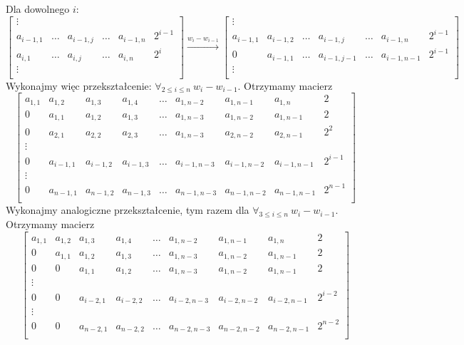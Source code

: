 \documentclass[]{sinol}
\begin{document}
\begin{zadanie}
        Dla dowolnego $i$:
        \[
         \begin{bmatrix}
            \vdots \\
            a_{i-1, 1} & \dots & a_{i-1,j} & \dots & a_{i-1, n} & 2^{i-1} \\
            a_{i, 1} & \dots & a_{i,j} & \dots & a_{i, n} & 2^i \\
            \vdots \\
        \end{bmatrix} 
        \xrightarrow{w_i-w_{i-1}}
        \begin{bmatrix}
            \vdots \\
            a_{i-1,1} & a_{i-1,2} & \dots & a_{i-1,j} & \dots & a_{i-1, n} & 2^{i-1} \\
            0 & a_{i-1,1} & \dots & a_{i-1,j-1} & \dots & a_{i-1, n-1} & 2^{i-1} \\
            \vdots \\
        \end{bmatrix} 
        \]
        Wykonajmy więc przekształcenie:
        \(\forall_{2\leq i \leq n} \ w_i - w_{i-1}\). Otrzymamy macierz
        \[
        \begin{bmatrix}
            a_{1,1} & a_{1,2} & a_{1,3} & a_{1,4} & \dots & a_{1,n-2} & a_{1, n-1} & a_{1,n} & 2 \\
            0 & a_{1,1} & a_{1,2} & a_{1,3} & \dots & a_{1,n-3} & a_{1,n-2} & a_{1, n-1} & 2 \\
            0 & a_{2,1} & a_{2,2} & a_{2,3} & \dots & a_{1,n-3} & a_{2,n-2} & a_{2, n-1} & 2^2 \\
            \vdots \\
            0 & a_{i-1,1} & a_{i-1,2} & a_{i-1,3} & \dots & a_{i-1,n-3} & a_{i-1, n-2}  & a_{i-1, n-1} & 2^{i-1} \\
            \vdots \\
            0 & a_{n-1,1} & a_{n-1,2} & a_{n-1,3} & \dots & a_{n-1,n-3} & a_{n-1, n-2}  & a_{n-1, n-1} & 2^{n-1} \\
        \end{bmatrix}
        \]
        Wykonajmy analogiczne przekształcenie, tym razem dla \(\forall_{3\leq i \leq n} \ w_i - w_{i-1}\). Otrzymamy macierz
        \[
        \begin{bmatrix}
            a_{1,1} & a_{1,2} & a_{1,3} & a_{1,4} & \dots & a_{1,n-2} & a_{1, n-1} & a_{1,n} & 2 \\
            0 & a_{1,1} & a_{1,2} & a_{1,3} & \dots & a_{1,n-3} & a_{1,n-2} & a_{1, n-1} & 2 \\
            0 & 0 & a_{1,1} & a_{1,2} & \dots &  a_{1,n-3} & a_{1,n-2} & a_{1, n-1} & 2 \\
            \vdots \\
            0 & 0 & a_{i-2,1} & a_{i-2,2} & \dots & a_{i-2,n-3} & a_{i-2, n-2}  & a_{i-2, n-1} & 2^{i-2} \\
            \vdots \\
            0 & 0 & a_{n-2,1} & a_{n-2,2} & \dots & a_{n-2,n-3} & a_{n-2, n-2}  & a_{n-2, n-1} & 2^{n-2} \\
        \end{bmatrix}
        \]


\end{zadanie}
\end{document}
